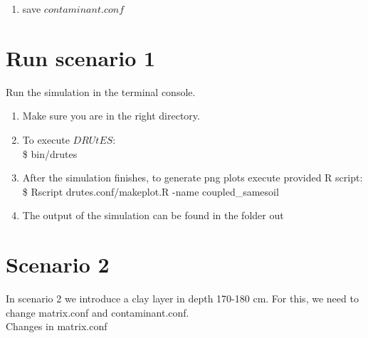 \documentclass[
10pt, %
a4paper, %
oneside, %
headinclude,footinclude, %
BCOR5mm, %
]{scrartcl}
\begin{document}
\begin{enumerate}
{\begin{tabular}{|c | c | c|c |}
			\hline
		\end{tabular}
	}
\item save $contaminant.conf$
\end{enumerate}

\section*{Run scenario 1}
Run the simulation in the terminal console.
\begin{enumerate}
\item Make sure you are in the right directory. 
\item To execute $DRUtES$: \\
\$ bin/drutes
\item After the simulation finishes, to generate png plots execute provided R script: \\
\$ Rscript drutes.conf/makeplot.R -name coupled\_samesoil \\
\item The output of the simulation can be found in the folder out
\end{enumerate}

\section*{Scenario 2}

In scenario 2 we introduce a clay layer in depth 170-180 cm. For this, we need to change matrix.conf and contaminant.conf. \\

Changes in matrix.conf 
\end{document}
